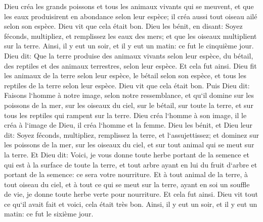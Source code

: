 \verse Dieu créa les grands poissons et tous les animaux vivants qui se meuvent, et que les eaux produisirent en abondance selon leur espèce; il créa aussi tout oiseau ailé selon son espèce. Dieu vit que cela était bon. 
\verse Dieu les bénit, en disant: Soyez féconds, multipliez, et remplissez les eaux des mers; et que les oiseaux multiplient sur la terre. 
\verse Ainsi, il y eut un soir, et il y eut un matin: ce fut le cinquième jour. 
\verse Dieu dit: Que la terre produise des animaux vivants selon leur espèce, du bétail, des reptiles et des animaux terrestres, selon leur espèce. Et cela fut ainsi. 
\verse Dieu fit les animaux de la terre selon leur espèce, le bétail selon son espèce, et tous les reptiles de la terre selon leur espèce. Dieu vit que cela était bon. 
\verse Puis Dieu dit: Faisons l`homme à notre image, selon notre ressemblance, et qu`il domine sur les poissons de la mer, sur les oiseaux du ciel, sur le bétail, sur toute la terre, et sur tous les reptiles qui rampent sur la terre. 
\verse Dieu créa l`homme à son image, il le créa à l`image de Dieu, il créa l`homme et la femme. 
\verse Dieu les bénit, et Dieu leur dit: Soyez féconds, multipliez, remplissez la terre, et l`assujettissez; et dominez sur les poissons de la mer, sur les oiseaux du ciel, et sur tout animal qui se meut sur la terre. 
\verse Et Dieu dit: Voici, je vous donne toute herbe portant de la semence et qui est à la surface de toute la terre, et tout arbre ayant en lui du fruit d`arbre et portant de la semence: ce sera votre nourriture. 
\verse Et à tout animal de la terre, à tout oiseau du ciel, et à tout ce qui se meut sur la terre, ayant en soi un souffle de vie, je donne toute herbe verte pour nourriture. Et cela fut ainsi. 
\verse Dieu vit tout ce qu`il avait fait et voici, cela était très bon. Ainsi, il y eut un soir, et il y eut un matin: ce fut le sixième jour. 

